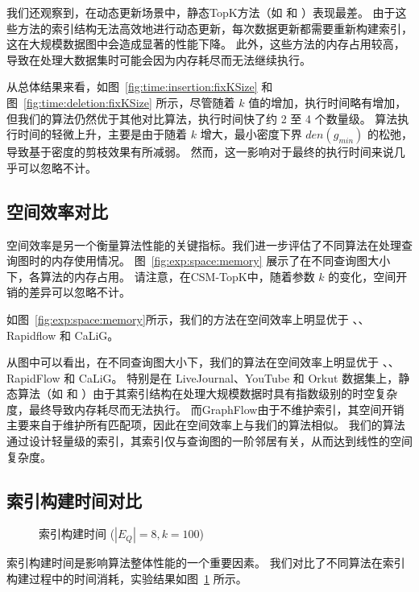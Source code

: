 我们还观察到，在动态更新场景中，静态TopK方法（如 \itk 和 \pm）表现最差。
由于这些方法的索引结构无法高效地进行动态更新，每次数据更新都需要重新构建索引，这在大规模数据图中会造成显著的性能下降。
此外，这些方法的内存占用较高，导致在处理大数据集时可能会因为内存耗尽而无法继续执行。


从总体结果来看，如图~\ref{fig:time:insertion:fixKSize} 和图~\ref{fig:time:deletion:fixKSize} 所示，尽管随着 $k$ 值的增加，执行时间略有增加，但我们的算法仍然优于其他对比算法，执行时间快了约 2 至 4 个数量级。
算法执行时间的轻微上升，主要是由于随着 $k$ 增大，最小密度下界 $den(g_{min})$ 的松弛，导致基于密度的剪枝效果有所减弱。
然而，这一影响对于最终的执行时间来说几乎可以忽略不计。


\subsection{空间效率对比}
\label{ch5:space}

空间效率是另一个衡量算法性能的关键指标。我们进一步评估了不同算法在处理查询图时的内存使用情况。
图~\ref{fig:exp:space:memory} 展示了在不同查询图大小下，各算法的内存占用。
请注意，在CSM-TopK中，随着参数 $k$ 的变化，空间开销的差异可以忽略不计。

如图~\ref{fig:exp:space:memory}所示，我们的方法在空间效率上明显优于 \itk、\pm、Rapidflow 和 CaLiG。

从图中可以看出，在不同查询图大小下，我们的算法在空间效率上明显优于 \itk、\pm、RapidFlow 和 CaLiG。
特别是在 LiveJournal、YouTube 和 Orkut 数据集上，静态算法（如 \itk 和 \pm）由于其索引结构在处理大规模数据时具有指数级别的时空复杂度，最终导致内存耗尽而无法执行。
而GraphFlow由于不维护索引，其空间开销主要来自于维护所有匹配项，因此在空间效率上与我们的算法相似。
我们的算法通过设计轻量级的索引，其索引仅与查询图的一阶邻居有关，从而达到线性的空间复杂度。


\subsection{索引构建时间对比}
\label{ch5:index-construction}
\begin{figure}[h!]
    \centering
    \caption{索引构建时间  ($|E_Q|=8, k=100$)}
    \label{fig:exp:time:index}
\end{figure} 
索引构建时间是影响算法整体性能的一个重要因素。
我们对比了不同算法在索引构建过程中的时间消耗，实验结果如图~\ref{fig:exp:time:index} 所示。   


